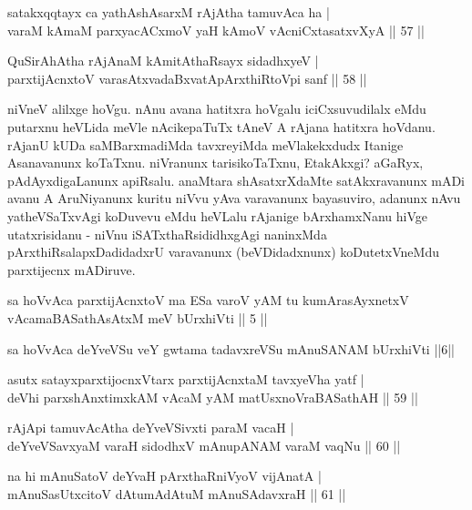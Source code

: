\begin{shl}
satakxqqtayx ca yathAshAsarxM rAjA\s tha tamuvAca ha | \\
varaM kAmaM parxyacACxmoV yaH kAmoV vAcniCxtasatxvXyA \hfill|| 57 || 
\end{shl}

\begin{shl}
QuSirAhAtha rAjAnaM kAmitAthaRsayx sidadhxyeV | \\
parxtijAcnxtoV varasAtxvadaBxvatA\s pArxthiRtoV\s pi sanf \hfill|| 58 || 
\end{shl}

\begin{artha}
niVneV alilxge hoVgu. nAnu avana hatitxra hoVgalu iciCxsuvudilalx eMdu 
putarxnu heVLida meVle nAcikepaTuTx tAneV A rAjana hatitxra hoVdanu. 
rAjanU kUDa saMBarxmadiMda tavxreyiMda meVlakekxdudx Itanige Asanavanunx 
koTaTxnu. niVranunx tarisikoTaTxnu, EtakAkxgi? aGaRyx, 
pAdAyxdigaLanunx apiRsalu. anaMtara shAsatxrXdaMte satAkxravanunx mADi 
avanu A AruNiyanunx kuritu niVvu yAva varavanunx 
bayasuviro, adanunx nAvu yatheVSaTxvAgi koDuvevu eMdu heVLalu rAjanige 
bArxhamxNanu hiVge utatxrisidanu - niVnu iSATxthaRsididhxgAgi 
naninxMda pArxthiRsalapxDadidadxrU varavanunx (beVDidadxnunx) 
koDutetxVneMdu parxtijecnx mADiruve.
\end{artha}

\begin{kandikeshl}
sa hoVvAca parxtijAcnxtoV ma ESa varoV yAM tu kumArasAyxnetxV vAcamaBASathAsAtxM meV bUrxhiVti || 5 ||
\end{kandikeshl}

\begin{kandikeshl}
sa hoVvAca deYveVSu veY gwtama tadavxreVSu mAnuSANAM bUrxhiVti ||6||
\end{kandikeshl}

\begin{shl}
asutx satayxparxtijocnxV\s tarx parxtijAcnxtaM tavxyeVha yatf | \\
deVhi parxshAnxtimxkAM vAcaM yAM matUsxnoVraBASathAH \hfill|| 59 || 
\end{shl}

\begin{shl}
rAjA\s pi tamuvAcAtha deYveVSivxti paraM vacaH | \\
deYveVSavxyaM varaH sidodhxV mAnupANAM varaM vaqNu \hfill|| 60 || 
\end{shl}

\begin{shl}
na hi mAnuSatoV deYvaH pArxthaRniVyoV vijAnatA | \\
mAnuSasUtxcitoV dAtumAdAtuM mAnuSAdavxraH \hfill|| 61 || 
\end{shl}


